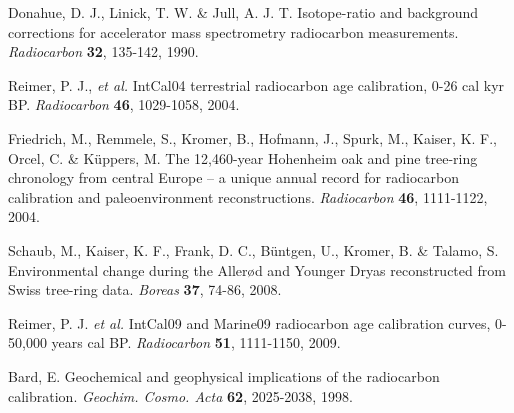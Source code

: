 \documentclass[12pt]{article}
\newcommand{\INTCAL}{{\sc IntCal}}
\begin{document}
\begin{thebibliography}{9}
Donahue, D. J., Linick, T. W. \& Jull, A. J. T.
Isotope-ratio and background corrections for accelerator mass spectrometry
radiocarbon measurements.
{\em Radiocarbon} {\bf 32}, 135-142, 1990.

Reimer, P. J., {\em et al.}
\INTCAL04 terrestrial radiocarbon age calibration, 0-26 cal kyr BP.
{\em Radiocarbon} {\bf 46}, 1029-1058, 2004.

Friedrich, M., Remmele, S., Kromer, B., Hofmann, J., Spurk, M.,
Kaiser, K. F., Orcel, C. \& K\"uppers, M.
The 12,460-year Hohenheim oak and pine tree-ring chronology from central
Europe -- a unique annual record for radiocarbon calibration and
paleoenvironment reconstructions.
{\em Radiocarbon} {\bf 46}, 1111-1122, 2004.

Schaub, M., Kaiser, K. F., Frank, D. C., B\"untgen, U., Kromer, B.
\& Talamo, S.
Environmental change during the Aller\o d and Younger Dryas reconstructed
from Swiss tree-ring data.
{\em Boreas} {\bf 37}, 74-86, 2008.

Reimer, P. J. {\em et al.}
\INTCAL09 and {\sc Marine}09 radiocarbon age calibration curves, 0-50,000
years cal BP.
{\em Radiocarbon} {\bf 51}, 1111-1150, 2009.

Bard, E.
Geochemical and geophysical implications of the radiocarbon calibration.
{\em Geochim. Cosmo. Acta} {\bf 62}, 2025-2038, 1998.


\end{thebibliography}
\end{document}
